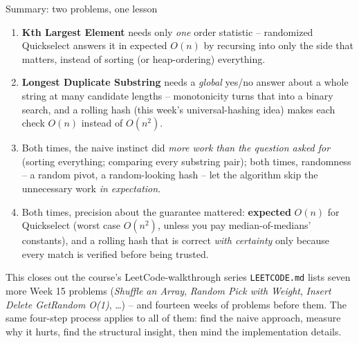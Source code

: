\documentclass[11pt,aspectratio=169]{beamer}
\begin{document}
\begin{frame}{Summary: two problems, one lesson}
  \footnotesize
  \begin{enumerate}
    \item \textbf{Kth Largest Element} needs only \emph{one} order statistic --
    randomized Quickselect answers it in expected $O(n)$ by recursing into only the
    side that matters, instead of sorting (or heap-ordering) everything.
    \item \textbf{Longest Duplicate Substring} needs a \emph{global} yes/no answer
    about a whole string at many candidate lengths -- monotonicity turns that into a
    binary search, and a rolling hash (this week's universal-hashing idea) makes each
    check $O(n)$ instead of $O(n^2)$.
    \item Both times, the naive instinct did \emph{more work than the question asked
    for} (sorting everything; comparing every substring pair); both times, randomness
    -- a random pivot, a random-looking hash -- let the algorithm skip the unnecessary
    work \emph{in expectation}.
    \item Both times, precision about the guarantee mattered: \textbf{expected} $O(n)$
    for Quickselect (worst case $O(n^2)$, unless you pay median-of-medians' constants),
    and a rolling hash that is correct \emph{with certainty} only because every match is
    verified before being trusted.
  \end{enumerate}
  \begin{alertblock}{This closes out the course's LeetCode-walkthrough series}
    \texttt{LEETCODE.md} lists seven more Week 15 problems (\emph{Shuffle an Array},
    \emph{Random Pick with Weight}, \emph{Insert Delete GetRandom O(1)}, \dots) -- and
    fourteen weeks of problems before them. The same four-step process applies to all
    of them: find the naive approach, measure why it hurts, find the structural
    insight, then mind the implementation details.
  \end{alertblock}
\end{frame}
\end{document}
